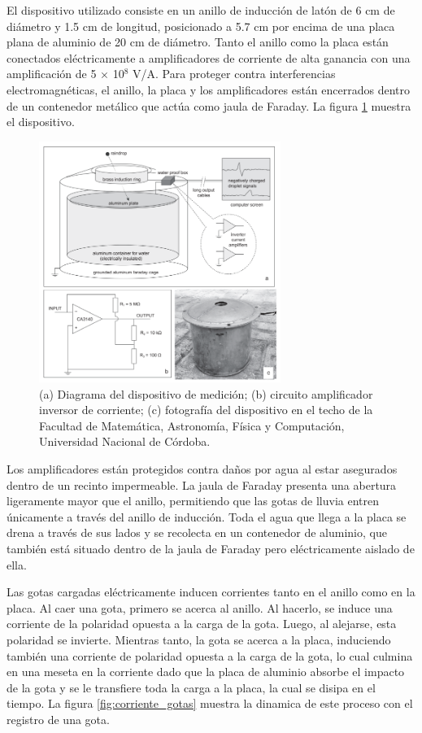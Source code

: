 \documentclass[12pt,a4paper]{article}
\begin{document}
El dispositivo utilizado consiste en un anillo de inducción de latón de 6 cm de diámetro y 1.5 cm de longitud, posicionado a 5.7 cm por encima de una placa plana de aluminio de 20 cm de diámetro. Tanto el anillo como la placa están conectados eléctricamente a amplificadores de corriente de alta ganancia con una amplificación de 5 $\times$ 10$^8$ V/A. Para proteger contra interferencias electromagnéticas, el anillo, la placa y los amplificadores están encerrados dentro de un contenedor metálico que actúa como jaula de Faraday. La figura \ref{fig:instrumento_medicion} muestra el dispositivo.

\begin{figure}[!hb]
    \centering
    \includegraphics[width=0.7\textwidth]{figures/instrumento_de_medicion.png}
    \caption{(a) Diagrama del dispositivo de medición; (b) circuito amplificador inversor de corriente; (c) fotografía del dispositivo en el techo de la Facultad de Matemática, Astronomía, Física y Computación, Universidad Nacional de Córdoba.}
    \label{fig:instrumento_medicion}
\end{figure}

Los amplificadores están protegidos contra daños por agua al estar asegurados dentro de un recinto impermeable. La jaula de Faraday presenta una abertura ligeramente mayor que el anillo, permitiendo que las gotas de lluvia entren únicamente a través del anillo de inducción. Toda el agua que llega a la placa se drena a través de sus lados y se recolecta en un contenedor de aluminio, que también está situado dentro de la jaula de Faraday pero eléctricamente aislado de ella.

Las gotas cargadas eléctricamente inducen corrientes tanto en el anillo como en la placa. Al caer una gota, primero se acerca al anillo. Al hacerlo, se induce una corriente de la polaridad opuesta a la carga de la gota. Luego, al alejarse, esta polaridad se invierte. Mientras tanto, la gota se acerca a la placa, induciendo también una corriente de polaridad opuesta a la carga de la gota, lo cual culmina en una meseta en la corriente dado que la placa de aluminio absorbe el impacto de la gota y se le transfiere toda la carga a la placa, la cual se disipa en el tiempo. La figura \ref{fig:corriente_gotas} muestra la dinamica de este proceso con el registro de una gota.
\end{document}
